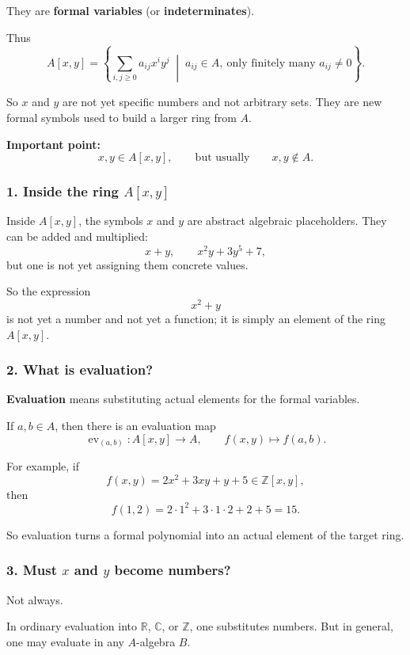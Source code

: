 \documentclass[12pt,a4paper]{article}
\theoremstyle{plain}
\theoremstyle{definition}      %
\begin{document}
	They are \textbf{formal variables} (or \textbf{indeterminates}).
	
	Thus
	\[
	A[x,y]
	=
	\left\{
	\sum_{i,j\ge 0} a_{ij}x^i y^j
	\;\middle|\;
	a_{ij}\in A,\ \text{only finitely many }a_{ij}\neq 0
	\right\}.
	\]
	
	So \(x\) and \(y\) are not yet specific numbers and not arbitrary sets.
	They are new formal symbols used to build a larger ring from \(A\).
	
	\medskip
	
	\textbf{Important point:}
	\[
	x,y\in A[x,y],
	\qquad\text{but usually}\qquad
	x,y\notin A.
	\]
	
	\subsubsection*{1. Inside the ring \(A[x,y]\)}
	
	Inside \(A[x,y]\), the symbols \(x\) and \(y\) are abstract algebraic placeholders.
	They can be added and multiplied:
	\[
	x+y,\qquad x^2y+3y^5+7,
	\]
	but one is not yet assigning them concrete values.
	
	So the expression
	\[
	x^2+y
	\]
	is not yet a number and not yet a function; it is simply an element of the ring \(A[x,y]\).
	
	\subsubsection*{2. What is evaluation?}
	
	\textbf{Evaluation} means substituting actual elements for the formal variables.
	
	If \(a,b\in A\), then there is an evaluation map
	\[
	\operatorname{ev}_{(a,b)}:A[x,y]\to A,
	\qquad
	f(x,y)\mapsto f(a,b).
	\]
	
	For example, if
	\[
	f(x,y)=2x^2+3xy+y+5\in \mathbb Z[x,y],
	\]
	then
	\[
	f(1,2)=2\cdot 1^2+3\cdot 1\cdot 2+2+5=15.
	\]
	
	So evaluation turns a formal polynomial into an actual element of the target ring.
	
	\subsubsection*{3. Must \(x\) and \(y\) become numbers?}
	
	Not always.
	
	In ordinary evaluation into \(\mathbb R\), \(\mathbb C\), or \(\mathbb Z\), one substitutes numbers.
	But in general, one may evaluate in any \(A\)-algebra \(B\).
	
\end{document}
